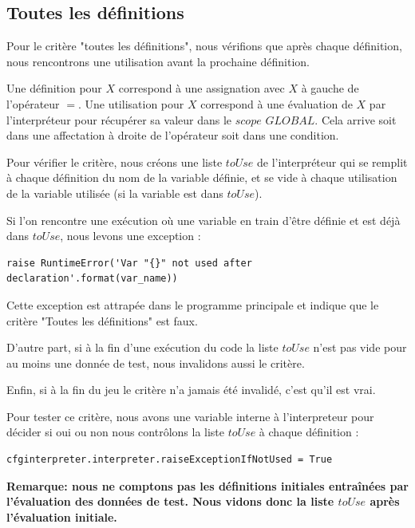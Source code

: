 \documentclass[a4paper]{article}
\begin{document}
\subsection{Toutes les définitions}

Pour le critère "toutes les définitions", nous vérifions que après chaque définition, nous rencontrons une utilisation avant la prochaine définition.

Une définition pour $X$ correspond à une assignation avec $X$ à gauche de l'opérateur $=$. 
Une utilisation pour $X$ correspond à une évaluation de $X$ par l'interpréteur pour récupérer sa valeur dans le $scope$ $GLOBAL$. Cela arrive soit dans une affectation à droite de l'opérateur soit dans une condition. 

Pour vérifier le critère, nous créons une liste $toUse$ de l'interpréteur qui se remplit à chaque définition du nom de la variable définie, et se vide à chaque utilisation de la variable utilisée (si la variable est dans $toUse$). 

Si l'on rencontre une exécution où une variable en train d'être définie et est déjà dans $toUse$, nous levons une exception :
\begin{verbatim}
raise RuntimeError('Var "{}" not used after declaration'.format(var_name))
\end{verbatim}
Cette exception est attrapée dans le programme principale et indique que le critère "Toutes les définitions" est faux. 

D'autre part, si à la fin d'une exécution du code la liste $toUse$ n'est pas vide pour au moins une donnée de test, nous invalidons aussi le critère. 

Enfin, si à la fin du jeu le critère n'a jamais été invalidé, c'est qu'il est vrai. 

Pour tester ce critère, nous avons une variable interne à l'interpreteur pour décider si oui ou non nous contrôlons la liste $toUse$ à chaque définition :
\begin{verbatim}
cfginterpreter.interpreter.raiseExceptionIfNotUsed = True
\end{verbatim}

\textbf{Remarque: nous ne comptons pas les définitions initiales entraînées par l'évaluation des données de test. Nous vidons donc la liste $toUse$ après l'évaluation initiale.}
\end{document}
